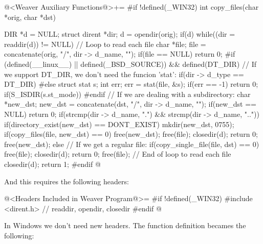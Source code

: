 \iniciocodigo
@<Weaver Auxiliary Functions@>+=
#if !defined(_WIN32)
int copy_files(char *orig, char *dst){
  DIR *d = NULL;
  struct dirent *dir;
  d = opendir(orig);
  if(d){
    while((dir = readdir(d)) != NULL){ // Loop to read each file
      char *file;
      file = concatenate(orig, "/", dir -> d_name, "");
      if(file == NULL){
        return 0;
      }
#if (defined(__linux__) || defined(_BSD_SOURCE)) && defined(DT_DIR)
      // If we support DT_DIR, we don't need the funcion 'stat':
      if(dir -> d_type == DT_DIR){
#else
      struct stat s;
      int err;
      err = stat(file, &s);
      if(err == -1) return 0;
      if(S_ISDIR(s.st_mode)){
#endif
      // If we are dealing with a subdirectory:
        char *new_dst;
        new_dst = concatenate(dst, "/", dir -> d_name, "");
        if(new_dst == NULL){
          return 0;
        }
        if(strcmp(dir -> d_name, ".") && strcmp(dir -> d_name, "..")){
          if(directory_exist(new_dst) == DONT_EXIST) mkdir(new_dst, 0755);
          if(copy_files(file, new_dst) == 0){
            free(new_dst);
            free(file);
            closedir(d);
            return 0;
          }
        }
        free(new_dst);
      }
      else{
        // If we get a regular file:
        if(copy_single_file(file, dst) == 0){
          free(file);
          closedir(d);
          return 0;
        }
      }
    free(file);
    } // End of loop to read each file
    closedir(d);
  }
  return 1;
}
#endif
@
\fimcodigo

And this requires the following headers:

\iniciocodigo
@<Headers Included in Weaver Program@>=
#if !defined(_WIN32)
#include <dirent.h> // readdir, opendir, closedir
#endif
@
\fimcodigo

In Windows we don't need new headers. The function definition becames
the following:

}

